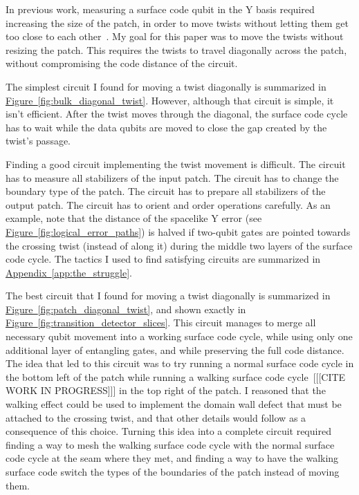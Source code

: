 \documentclass[onecolumn,unpublished,a4paper]{quantumarticle}
\theoremstyle{definition}
\theoremstyle{definition}
\theoremstyle{definition}
\DeclareRobustCommand{\app}[1]{\hyperref[app:#1]{Appendix~\ref*{app:#1}}}
\newcommand{\fig}[1]{\hyperref[fig:#1]{Figure~\ref*{fig:#1}}}
\begin{document}
In previous work, measuring a surface code qubit in the Y basis required increasing the size of the patch, in order to move twists without letting them get too close to each other~\cite{brown2017surfacetwists,bombin2021logical,chamberland2022universal}.
My goal for this paper was to move the twists without resizing the patch.
This requires the twists to travel diagonally across the patch, without compromising the code distance of the circuit.

The simplest circuit I found for moving a twist diagonally is summarized in \fig{bulk_diagonal_twist}.
However, although that circuit is simple, it isn't efficient.
After the twist moves through the diagonal, the surface code cycle has to wait while the data qubits are moved to close the gap created by the twist's passage.

Finding a good circuit implementing the twist movement is difficult.
The circuit has to measure all stabilizers of the input patch.
The circuit has to change the boundary type of the patch.
The circuit has to prepare all stabilizers of the output patch.
The circuit has to orient and order operations carefully.
As an example, note that the distance of the spacelike Y error (see \fig{logical_error_paths}) is halved if two-qubit gates are pointed towards the crossing twist (instead of along it) during the middle two layers of the surface code cycle.
The tactics I used to find satisfying circuits are summarized in \app{the_struggle}.

The best circuit that I found for moving a twist diagonally is summarized in \fig{patch_diagonal_twist}, and shown exactly in \fig{transition_detector_slices}.
This circuit manages to merge all necessary qubit movement into a working surface code cycle, while using only one additional layer of entangling gates, and while preserving the full code distance.
The idea that led to this circuit was to try running a normal surface code cycle in the bottom left of the patch while running a walking surface code cycle~[[[CITE WORK IN PROGRESS]]] in the top right of the patch.
I reasoned that the walking effect could be used to implement the domain wall defect that must be attached to the crossing twist, and that other details would follow as a consequence of this choice.
Turning this idea into a complete circuit required finding a way to mesh the walking surface code cycle with the normal surface code cycle at the seam where they met, and finding a way to have the walking surface code switch the types of the boundaries of the patch instead of moving them.
\end{document}
